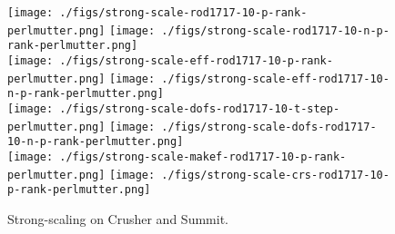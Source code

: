 \begin{figure*}[t]
  \begin{center}
     \texttt{[image: ./figs/strong-scale-rod1717-10-p-rank-perlmutter.png]}
     \texttt{[image: ./figs/strong-scale-rod1717-10-n-p-rank-perlmutter.png]}
     \\
     \texttt{[image: ./figs/strong-scale-eff-rod1717-10-p-rank-perlmutter.png]}
     \texttt{[image: ./figs/strong-scale-eff-rod1717-10-n-p-rank-perlmutter.png]}
     \\
     \texttt{[image: ./figs/strong-scale-dofs-rod1717-10-t-step-perlmutter.png]}
     \texttt{[image: ./figs/strong-scale-dofs-rod1717-10-n-p-rank-perlmutter.png]}
     \\
     \texttt{[image: ./figs/strong-scale-makef-rod1717-10-p-rank-perlmutter.png]}
     \texttt{[image: ./figs/strong-scale-crs-rod1717-10-p-rank-perlmutter.png]}
   \caption{\label{perf170-perlmutter}Strong-scaling on Crusher and Summit.}
  \end{center}
\end{figure*}



